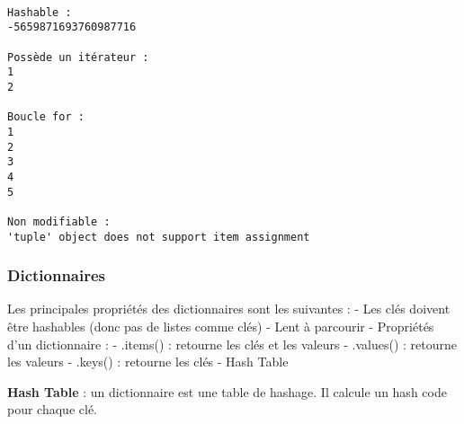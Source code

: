 \documentclass[11pt]{article}
\begin{document}
    \begin{Verbatim}[commandchars=\\\{\}]

Hashable :
-5659871693760987716

Possède un itérateur :
1
2

Boucle for :
1
2
3
4
5

Non modifiable :
'tuple' object does not support item assignment
    \end{Verbatim}

    \hypertarget{dictionnaires}{%
\subsubsection{Dictionnaires}\label{dictionnaires}}

Les principales propriétés des dictionnaires sont les suivantes : - Les
clés doivent être hashables (donc pas de listes comme clés) - Lent à
parcourir - Propriétés d'un dictionnaire : - .items() : retourne les
clés et les valeurs - .values() : retourne les valeurs - .keys() :
retourne les clés - Hash Table

\textbf{Hash Table} : un dictionnaire est une table de hashage. Il
calcule un hash code pour chaque clé.
\end{document}
